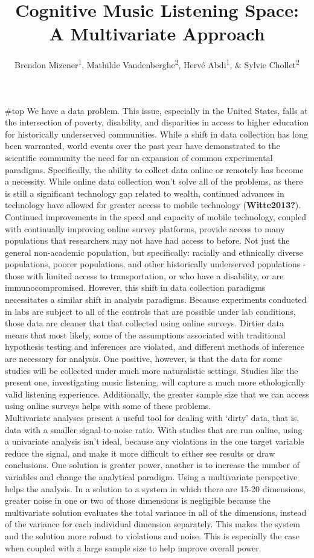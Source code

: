 \documentclass[
  english,
  man,floatsintext]{apa6}
\title{Cognitive Music Listening Space: A Multivariate Approach}
\author{Brendon Mizener\textsuperscript{1}, Mathilde Vandenberghe\textsuperscript{2}, Hervé Abdi\textsuperscript{1}, \& Sylvie Chollet\textsuperscript{2}}
\date{}
\affiliation{\vspace{0.5cm}\textsuperscript{1} University of Texas at Dallas\\\textsuperscript{2} YNCREA}
\begin{document}
\maketitle

\#top
We have a data problem. This issue, especially in the United States, falls at the intersection of poverty, disability, and disparities in access to higher education for historically underserved communities. While a shift in data collection has long been warranted, world events over the past year have demonstrated to the scientific community the need for an expansion of common experimental paradigms. Specifically, the ability to collect data online or remotely has become a necessity. While online data collection won't solve all of the problems, as there is still a significant technology gap related to wealth, continued advances in technology have allowed for greater access to mobile technology (\textbf{Witte2013?}). Continued improvements in the speed and capacity of mobile technology, coupled with continually improving online survey platforms, provide access to many populations that researchers may not have had access to before. Not just the general non-academic population, but specifically: racially and ethnically diverse populations, poorer populations, and other historically underserved populations - those with limited access to transportation, or who have a disability, or are immunocompromised.
However, this shift in data collection paradigms necessitates a similar shift in analysis paradigms. Because experiments conducted in labs are subject to all of the controls that are possible under lab conditions, those data are cleaner that that collected using online surveys. Dirtier data means that most likely, some of the assumptions associated with traditional hypothesis testing and inferences are violated, and different methods of inference are necessary for analysis. One positive, however, is that the data for some studies will be collected under much more naturalistic settings. Studies like the present one, investigating music listening, will capture a much more ethologically valid listening experience. Additionally, the greater sample size that we can access using online surveys helps with some of these problems.\\
Multivariate analyses present a useful tool for dealing with `dirty' data, that is, data with a smaller signal-to-noise ratio. With studies that are run online, using a univariate analysis isn't ideal, because any violations in the one target variable reduce the signal, and make it more difficult to either see results or draw conclusions. One solution is greater power, another is to increase the number of variables and change the analytical paradigm. Using a multivariate perspective helps the analysis. In a solution to a system in which there are 15-20 dimensions, greater noise in one or two of those dimensions is negligible because the multivariate solution evaluates the total variance in all of the dimensions, instead of the variance for each individual dimension separately. This makes the system and the solution more robust to violations and noise. This is especially the case when coupled with a large sample size to help improve overall power.\\
\end{document}
